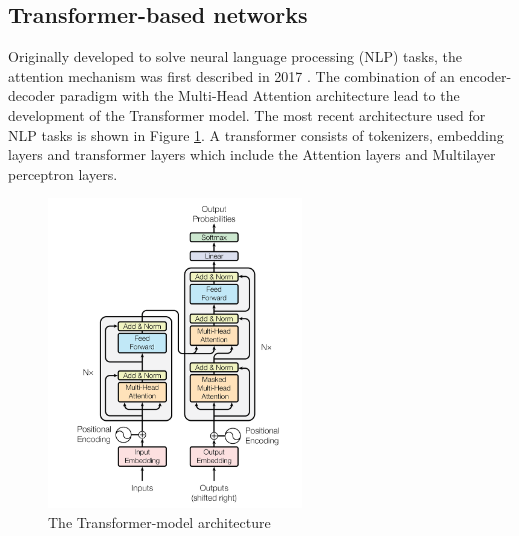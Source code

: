     

\subsection{Transformer-based networks}

Originally developed to solve neural language processing (NLP) tasks, the attention mechanism was first described in 2017 \cite{vaswani_attention_2023}.
The combination of an encoder-decoder paradigm with the Multi-Head Attention architecture lead to the development of the Transformer model. The most recent architecture used for NLP tasks is shown in Figure \ref{fig:transformer_model}.
A transformer consists of tokenizers, embedding layers and transformer layers which include the Attention layers and Multilayer perceptron layers.

\begin{figure}[H]
    \centering
    \includegraphics[width=0.6\textwidth]{Figures/Transformer.png}
    \caption{The Transformer-model architecture \cite{vaswani_attention_2023}}
    \label{fig:transformer_model}
\end{figure}

